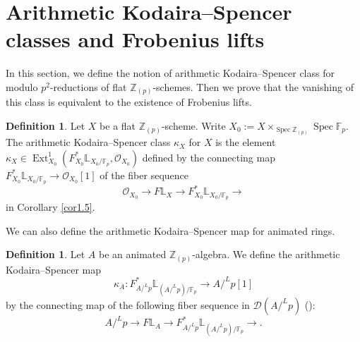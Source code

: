 \documentclass[11pt, a4paper]{amsart}
\theoremstyle{plain}
\theoremstyle{definition}
\newtheorem{definition}[theorem]{Definition}
\begin{document}
\section{Arithmetic Kodaira--Spencer classes and Frobenius lifts}\label{sec3}
In this section, we define the notion of arithmetic Kodaira--Spencer class for modulo $p^2$-reductions of flat $\mathbb Z_{(p)}$-schemes. Then we prove that the vanishing of this class is equivalent to the existence of Frobenius lifts.

\begin{definition}
    Let $X$ be a flat $\mathbb Z_{(p)}$-scheme. Write $X_0:=X\times _{\operatorname{Spec}\mathbb Z_{(p)}}\operatorname{Spec}\mathbb F_p$. The arithmetic Kodaira--Spencer class $\kappa_{X}$ for $X$ is the element $\kappa_X\in \operatorname{Ext}^1_{X_0}(F^*_{X_0}\mathbb L_{X_0/\mathbb F_p},\mathcal O_{X_0})$ defined by the connecting map $F_{X_0}^*\mathbb L_{X_0/\mathbb F_p}\to \mathcal O_{X_0}[1]$ of the fiber sequence\[\mathcal O_{X_0}\to F\mathbb L_X\to F_{X_0}^*\mathbb L_{X_0/\mathbb F_p}\to \] in Corollary \ref{cor1.5}.
\end{definition}
We can also define the arithmetic Kodaira--Spencer map for animated rings.

\begin{definition}\label{def5.1}
    Let $A$ be an animated $\mathbb Z_{(p)}$-algebra. We define the arithmetic Kodaira--Spencer map \[\kappa_A:F^*_{A/^Lp}\mathbb L_{(A/^Lp)/\mathbb F_p}\to A/^Lp[1]\] by the connecting map of the following fiber sequence in $\mathcal D(A/^Lp)$ (\cite[Theorem 5.3]{Shi26}):\[A/^Lp\to F\mathbb L_A\to F^*_{A/^Lp}\mathbb L_{(A/^Lp)/\mathbb F_p}\to. \]
\end{definition}
\end{document}
